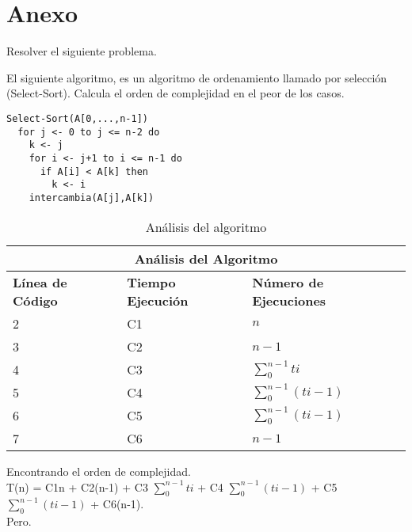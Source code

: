 \documentclass[12pt]{report}
\begin{document}
	\section{Anexo}
	
	Resolver el siguiente problema.
	
	El siguiente algoritmo, es un algoritmo de ordenamiento llamado por selección (Select-Sort). Calcula el orden de complejidad en el peor de los casos.
	
	\lstset{language=C, breaklines=true, basicstyle=\footnotesize}
	\lstset{numbers=left, numberstyle=\tiny, stepnumber=1, numbersep=10pt}
	\begin{lstlisting}
Select-Sort(A[0,...,n-1])
  for j <- 0 to j <= n-2 do
    k <- j 
    for i <- j+1 to i <= n-1 do
      if A[i] < A[k] then
        k <- i
    intercambia(A[j],A[k])
	\end{lstlisting}
	\newpage
	\begin{table}[htbp]
		\begin{center}
			\begin{tabular}{|l|l|l|}
				\hline
				\multicolumn{3}{|c|}{Análisis del Algoritmo} \\ 
				\hline
				\textbf{Línea de Código} & \textbf{Tiempo Ejecución} & \textbf{Número de Ejecuciones}\\
				\hline
				2 & C1 & $n$ \\ \hline
				3 & C2 & $n-1$ \\ \hline
				4 & C3 & $\sum_{0}^{n-1}ti$ \\ \hline
				5 & C4 & $\sum_{0}^{n-1}(ti-1)$ \\ \hline
				6 & C5 & $\sum_{0}^{n-1}(ti-1)$ \\ \hline
				7 & C6 & $n-1$ \\ \hline
			\end{tabular}
			\caption{Análisis del algoritmo}
			\label{tabla:analisis}
		\end{center}
	\end{table}
Encontrando el orden de complejidad.\\
	
T(n) = C1n + C2(n-1) + C3 $\sum_{0}^{n-1}ti$ + C4 $\sum_{0}^{n-1}(ti-1)$ + C5 $\sum_{0}^{n-1}(ti-1)$ + C6(n-1).\\

Pero.\\
\end{document}
